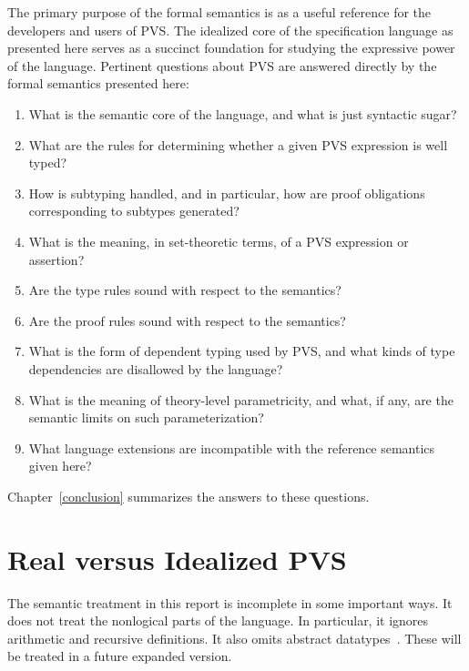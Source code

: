 \documentclass [12pt,twoside]{cslreport}
\begin{document}
The primary purpose of the formal semantics is as a useful reference for
the developers and users of PVS\@.  The idealized core of the
specification language as presented here serves as a succinct foundation
for studying the expressive power of the language.  Pertinent questions
about PVS are answered directly by the formal semantics presented here:
\begin{enumerate}
\item\label{one} What is the semantic core of the language, and what is
just syntactic sugar?

\item\label{two} What are the rules for determining whether a given PVS
expression is well typed?

\item\label{three} How is subtyping handled, and in particular, how are
proof obligations corresponding to subtypes generated?

\item\label{four} What is the meaning, in set-theoretic terms, of a PVS expression or
assertion?

\item\label{five} Are the type rules sound with respect to the semantics? 

\item\label{six} Are the proof rules sound with respect to the semantics?

\item\label{seven} What is the form of dependent typing used by PVS, and
what kinds of type dependencies are disallowed by the language?

\item\label{eight} What is the meaning of theory-level parametricity, and
what, if any, are the semantic limits on such parameterization?

\item\label{nine} What language extensions are incompatible with the reference
semantics given here?
\end{enumerate}

Chapter~\ref{conclusion} summarizes the answers to these questions.


\section{Real versus Idealized PVS}

The semantic treatment in this report is incomplete in some important ways.
It does not treat the nonlogical parts of the language.  In particular,
it ignores arithmetic and recursive definitions.  It also omits
abstract datatypes~\cite{Shankar:ADT97}.  These will be treated in a future
expanded version. 
\end{document}
